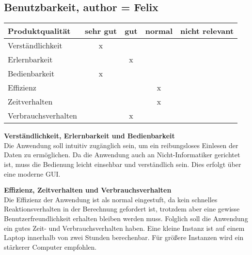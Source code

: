 \documentclass[parskip=full]{scrartcl} %
\begin{document}
\newpage 


\subsection{Benutzbarkeit, author = Felix}

    \begin{tabular}{|l| c| c| c| c|}
    \hline
        Produktqualität & sehr gut & gut & normal & nicht relevant \\
    \hline
        Verständlichkeit & x & & &\\
    \hline
        Erlernbarkeit & & x & &\\
    \hline
        Bedienbarkeit & x & & &\\
    \hline
        Effizienz & & & x &\\
    \hline
        Zeitverhalten & & & x &\\
    \hline
        Verbrauchsverhalten & & x & &\\
    \hline
    \end{tabular}

\textbf{Verständlichkeit, Erlernbarkeit und Bedienbarkeit}\\
Die Anwendung soll intuitiv zugänglich sein, um ein reibungsloses Einlesen der Daten zu ermöglichen. Da die Anwendung auch an Nicht-Informatiker gerichtet ist, muss die Bedienung leicht einsehbar und verständlich sein. Dies erfolgt über eine moderne GUI.

\textbf{Effizienz, Zeitverhalten und Verbrauchsverhalten}\\
Die Effizienz der Anwendung ist als normal eingestuft, da kein schnelles Reaktionsverhalten in der Berechnung gefordert ist, trotzdem aber eine gewisse Benutzerfreundlichkeit erhalten bleiben werden muss. Folglich soll die Anwendung ein gutes Zeit- und Verbrauchsverhalten haben.
Eine kleine Instanz ist auf einem Laptop innerhalb von zwei Stunden berechenbar. Für größere Instanzen wird ein stärkerer Computer empfohlen.


\newpage 
\end{document}
